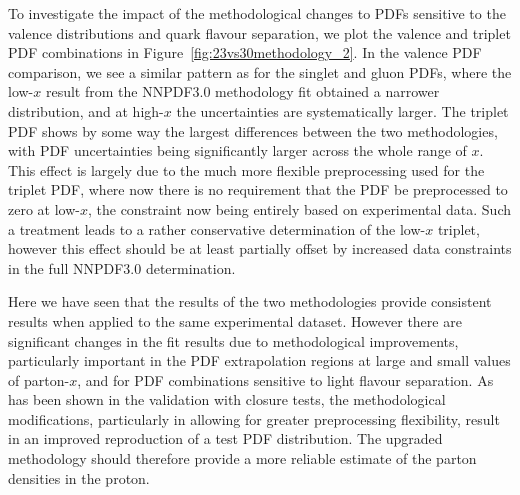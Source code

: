 To investigate the impact of the methodological changes to PDFs sensitive to the valence distributions and quark flavour separation, we plot the valence and triplet PDF combinations in Figure~\ref{fig:23vs30methodology_2}. In the valence PDF comparison, we see a similar pattern as for the singlet and gluon PDFs, where the low-$x$ result from the NNPDF3.0 methodology fit obtained a narrower distribution, and at high-$x$ the uncertainties are systematically larger. The triplet PDF shows by some way the largest differences between the two methodologies, with PDF uncertainties being significantly larger across the whole range of $x$. This effect is largely due to the much more flexible preprocessing used for the triplet PDF, where now there is no requirement that the PDF be preprocessed to zero at low-$x$, the constraint now being entirely based on experimental data. Such a treatment leads to a rather conservative determination of the low-$x$ triplet, however this effect should be at least partially offset by increased data constraints in the full NNPDF3.0 determination.

Here we have seen that the results of the two methodologies provide consistent results when applied to the same experimental dataset. However there are significant changes in the fit results due to methodological improvements, particularly important in the PDF extrapolation regions at large and small values of parton-$x$, and for PDF combinations sensitive to light flavour separation. As has been shown in the validation with closure tests, the methodological modifications, particularly in allowing for greater preprocessing flexibility, result in an improved reproduction of a test PDF distribution. The upgraded methodology should therefore provide a more reliable estimate of the parton densities in the proton.

